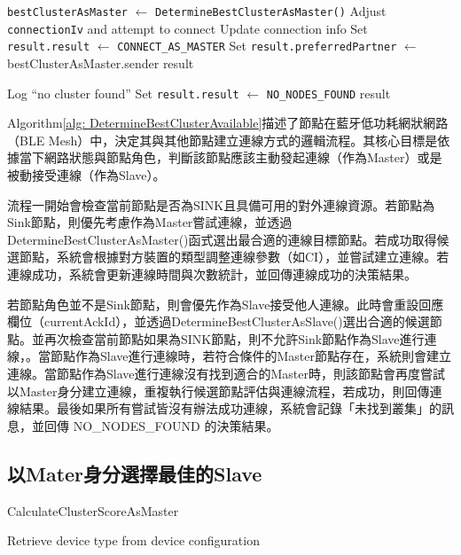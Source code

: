 \begin{ZhChapter}
\begin{algorithm}[H]
\begin{algorithmic}[1]
    \State \texttt{bestClusterAsMaster} $\gets$ \texttt{DetermineBestClusterAsMaster()}
        \State Adjust \texttt{connectionIv} and attempt to connect
            \State Update connection info
        \EndIf
        \State Set \texttt{result.result} $\gets$ \texttt{CONNECT\_AS\_MASTER}
        \State Set \texttt{result.preferredPartner} $\gets$ bestClusterAsMaster.sender
        \State \Return result
    \EndIf

    \State Log ``no cluster found''
    \State Set \texttt{result.result} $\gets$ \texttt{NO\_NODES\_FOUND}
    \State \Return result
\EndIf
\end{algorithmic}
\end{algorithm}

Algorithm\ref{alg: DetermineBestClusterAvailable}描述了節點在藍牙低功耗網狀網路（BLE Mesh）中，決定其與其他節點建立連線方式的邏輯流程。其核心目標是依據當下網路狀態與節點角色，判斷該節點應該主動發起連線（作為Master）或是被動接受連線（作為Slave）。

流程一開始會檢查當前節點是否為SINK且具備可用的對外連線資源。若節點為Sink節點，則優先考慮作為Master嘗試連線，並透過DetermineBestClusterAsMaster()函式選出最合適的連線目標節點。若成功取得候選節點，系統會根據對方裝置的類型調整連線參數（如CI），並嘗試建立連線。若連線成功，系統會更新連線時間與次數統計，並回傳連線成功的決策結果。

若節點角色並不是Sink節點，則會優先作為Slave接受他人連線。此時會重設回應欄位（currentAckId），並透過DetermineBestClusterAsSlave()選出合適的候選節點。並再次檢查當前節點如果為SINK節點，則不允許Sink節點作為Slave進行連線，。當節點作為Slave進行連線時，若符合條件的Master節點存在，系統則會建立連線。當節點作為Slave進行連線沒有找到適合的Master時，則該節點會再度嘗試以Master身分建立連線，重複執行候選節點評估與連線流程，若成功，則回傳連線結果。最後如果所有嘗試皆沒有辦法成功連線，系統會記錄「未找到叢集」的訊息，並回傳 NO\_NODES\_FOUND 的決策結果。

\subsection{以Mater身分選擇最佳的Slave}

\begin{algorithm}[H]
\caption{CalculateClusterScoreAsMaster}
\label{alg: CalculateClusterScoreAsMaster}
\begin{algorithmic}[1]
\State Retrieve device type from device configuration
  \EndIf
{}  \EndIf
{}  \EndIf
{}  \EndIf
{}  \EndIf
{}  \EndIf
{}  \EndIf
{}  \EndIf
{}  \EndIf


\end{algorithmic}
\end{algorithm}
\end{ZhChapter}
